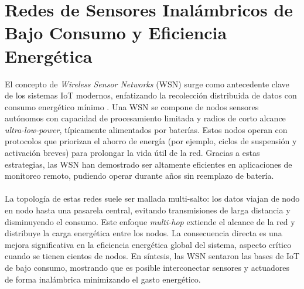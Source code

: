 \section{Redes de Sensores Inalámbricos de Bajo Consumo y Eficiencia Energética}
El concepto de \textit{Wireless Sensor Networks} (WSN) surge como antecedente clave de los sistemas IoT modernos, enfatizando la recolección distribuida de datos con consumo energético mínimo \cite{Watteyne2008Energy-Efficient}. Una WSN se compone de nodos sensores autónomos con capacidad de procesamiento limitada y radios de corto alcance \textit{ultra-low-power}, típicamente alimentados por baterías\cite{Sutar2010Energy}. Estos nodos operan con protocolos que priorizan el ahorro de energía (por ejemplo, ciclos de suspensión y activación breves) para prolongar la vida útil de la red\cite{Thangadurai2014Dynamic}. Gracias a estas estrategias, las WSN han demostrado ser altamente eficientes en aplicaciones de monitoreo remoto, pudiendo operar durante años sin reemplazo de batería\cite{Liu2008An}. 
\\\\
La topología de estas redes suele ser mallada multi-salto: los datos viajan de nodo en nodo hasta una pasarela central, evitando transmisiones de larga distancia y disminuyendo el consumo. Este enfoque \textit{multi-hop} extiende el alcance de la red y distribuye la carga energética entre los nodos\cite{Dong2007Topology-Based}. La consecuencia directa es una mejora significativa en la eficiencia energética global del sistema, aspecto crítico cuando se tienen cientos de nodos. En síntesis, las WSN sentaron las bases de IoT de bajo consumo, mostrando que es posible interconectar sensores y actuadores de forma inalámbrica minimizando el gasto energético\cite{Jin2006EEMC:}.

